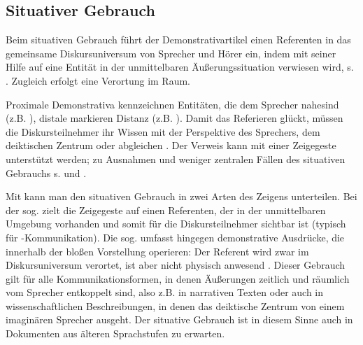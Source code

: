 \subsection{Situativer Gebrauch}\label{sec:situativ}

Beim situativen Gebrauch \parencite[auch deiktischer Gebrauch, z.B. bei][]{Bisle-Muller1991,Consten2004,Studler2011} führt der Demonstrativartikel einen Referenten in das gemeinsame Diskursuniversum von Sprecher und Hörer ein, indem mit seiner Hilfe auf eine Entität in der unmittelbaren Äußerungssituation verwiesen wird, s. . Zugleich erfolgt eine Verortung im Raum.

\begin{exe}
	\ex \label{ex:deikt} 
\end{exe}

Proximale Demonstrativa kennzeichnen Entitäten, die dem Sprecher nahe\linebreak sind (z.B. ), distale markieren Distanz (z.B. ).
Damit das Referieren glückt, müssen die Diskursteilnehmer ihr Wissen mit der Perspektive des Sprechers, dem deiktischen Zentrum oder   \parencite{Buhler1934} abgleichen  \parencite[s. auch][327ff.]{Hoffmann2009}. Der Verweis kann mit einer Zeigegeste unterstützt werden; zu Ausnahmen und weniger zentralen Fällen des situativen Gebrauchs s. \textcite[94-95]{Diessel1999} und \textcite[219--224]{Himmelmann1996}. 

Mit \textcite[]{Buhler1934} kann man den situativen Gebrauch in zwei Arten des Zeigens unterteilen. Bei der sog.  zielt die Zeigegeste auf einen Referenten, der in der unmittelbaren Umgebung vorhanden und somit für die Diskursteilnehmer sichtbar ist (typisch für -Kommunikation). Die sog.  umfasst hingegen demonstrative Ausdrücke, die innerhalb der bloßen Vorstellung operieren: Der Referent wird zwar im Diskursuniversum verortet, ist aber nicht physisch anwesend \parencite[s. auch][222]{Himmelmann1996}. Dieser Gebrauch gilt für alle Kommunikationsformen, in denen Äußerungen zeitlich und räumlich vom Sprecher entkoppelt sind, also z.B. in narrativen Texten \parencite[95]{Diessel1999} oder auch in wissenschaftlichen Beschreibungen, in denen das deiktische Zentrum von einem imaginären Sprecher ausgeht. Der situative Gebrauch ist in diesem Sinne auch in Dokumenten aus älteren Sprachstufen zu erwarten. 

